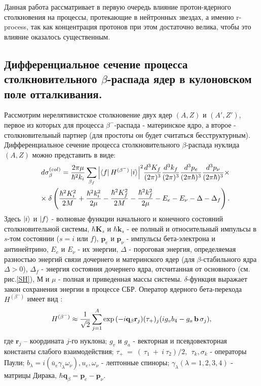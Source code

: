 \documentclass[%
master,    %
natbib,      %
subf,        %
href,        %
colorlinks,  %
]{disser}
\let\vec=\mathbf
\begin{document}
Данная работа рассматривает в первую очередь влияние протон-ядерного столкновения на процессы, протекающие в нейтронных звездах, а именно r-process, так как концентрация протонов при этом достаточно велика, чтобы это влияние оказалось существенным. 

\subsection{Дифференциальное сечение  процесса столкновительного
	$\beta$-распада ядер в кулоновском поле отталкивания.}

Рассмотрим нерелятивистское столкновение двух ядер $(A,Z)$ и $(A',Z')$,
первое из которых для процесса $\beta^-$-распада - материнское ядро, а второе
- столкновительный партнер (для простоты он будет считаться
бесструктурным).
Дифференциальное сечение процесса столкновительного $\beta$-распада
нуклида $(A,Z)$ можно  представить в виде:
\begin{eqnarray}\label{ds}
&&d\sigma^{(col)}_\beta={2\pi\mu\over{\hbar^2k_i}}\sum_{\beta_f}{\left| \bra{f} H^{(\beta^-)}
	\ket{i}\right|}^2{d^3 K_f\over{(2\pi)^3}}{d^3 k_f\over{(2\pi)^3}}
{d^3 p_e\over{(2\pi\hbar)^3}}{d^3 p_\nu\over{(2\pi\hbar)^3}}\times\nonumber\\
&&\times\;\delta\left({\hbar^2 K_i^2\over{2 M}}+{\hbar^2 k_i^2\over{2\mu}}-{\hbar^2 K_f^2\over{2 M}}-
{\hbar^2 k_f^2\over{2\mu}}-E_e-E_\nu-\Delta-\Delta_f\right).
\end{eqnarray}
Здесь $\ket{i}$ и $\ket{f}$ - волновые функции начального и конечного состояний
столкновительной системы,
$\hbar \vec K_s$ и $\hbar \vec k_s$ - ее полный и относительный импульсы
в $s$-том состоянии ($s=i$ или $f$),
$\vec p_e$ и $\vec p_\nu$ - импульсы бета-электрона и антинейтрино,
$E_e$ и $E_\nu$ - их энергии,
$\Delta$ - пороговая энергия, определяемая разностью энергий связи
дочернего и материнского ядер (для $\beta$-стабильного ядра $\Delta>0$),
$\Delta_f$  - энергия состояния дочернего ядра, отсчитанная от
основного (см. рис.\ref{SH}),
$М$ и $\mu$ - полная и приведенная массы системы.
$\delta$-функция выражает закон сохранения энергии в процессе СБР.
Оператор ядерного бета-перехода  $H^{(\beta^-)}$ имеет вид \cite{aiz}:
\begin{eqnarray}\label{nH^beta}
H^{(\beta^-)}\approx {{1}\over{\sqrt{2}}}\sum_{j=1}^{A} \exp{( -i \vec q_\beta \vec r_j)}
(\tau_+)_j ( i g_v b_4 - g_a\, \vec b\, \vec \sigma_j ),
\end{eqnarray}
где $\vec r_j$ -- координата $j$-го нуклона;
$g_v$ и $g_a$ - векторная и псевдовекторная константы слабого
взаимодействия;
$\tau_+~=~(~\tau_1~+~i~\tau_2)/2$, $\;\tau_k,\sigma_k$ - операторы Паули;
$b_\lambda=i ( \bar u_e \gamma_\lambda \omega_\nu), u_e, \omega_\nu$ - лептонные
спиноры; $\gamma_\lambda (\lambda = 1,2,3,4 )$ - матрицы Дирака,
$\hbar \vec q_\beta=\vec p_e-\vec p_\nu$.
\end{document}
